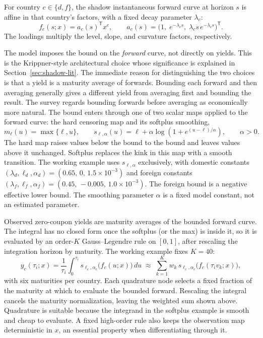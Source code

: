 \documentclass[11pt]{article}
\begin{document}
For country \(c\in\{d,f\}\), the shadow instantaneous forward curve at horizon \(s\) is affine in that country's factors, with a fixed decay parameter \(\lambda_c\):
\begin{equation}\label{eq:76}
 f_c(s;x)=a_c(s)^{\mathsf T}x^c,
 \qquad
 a_c(s)=\bigl(1,\;e^{-\lambda_c s},\;\lambda_c s\,e^{-\lambda_c s}
 \bigr)^{\mathsf T}.
\end{equation}
The loadings multiply the level, slope, and curvature factors, respectively.

The model imposes the bound on the \emph{forward} curve, not directly on yields. This is the Krippner-style architectural choice whose significance is explained in Section~\ref{sec:shadow-lit}. The immediate reason for distinguishing the two choices is that a yield is a maturity average of forwards. Bounding each forward and then averaging generally gives a different yield from averaging first and bounding the result. The survey regards bounding forwards before averaging as economically more natural. The bound enters through one of two scalar maps applied to the forward curve: the hard censoring map and its softplus smoothing,
\begin{equation}\label{eq:77}
 m_\ell(u)=\max\{\ell,u\},
 \qquad
 s_{\ell,\alpha}(u)=\ell+\alpha\log\!\left(1+e^{(u-\ell)/\alpha}\right),
 \qquad \alpha>0.
\end{equation}
The hard map raises values below the bound to the bound and leaves values above it unchanged. Softplus replaces the kink in this map with a smooth transition. The working example uses \(s_{\ell,\alpha}\) exclusively, with domestic constants
\((\lambda_d,\ell_d,\alpha_d)=(0.65,\,0,\,1.5\times10^{-3})\) and foreign constants
\((\lambda_f,\ell_f,\alpha_f)=(0.45,\,-0.005,\,1.0\times10^{-3})\). The foreign bound is a negative effective lower bound. The smoothing parameter \(\alpha\) is a fixed model constant, not an estimated parameter.

Observed zero-coupon yields are maturity averages of the bounded forward curve. The integral has no closed form once the softplus (or the max) is inside it, so it is evaluated by an order-\(K\) Gauss--Legendre rule on \([0,1]\), after rescaling the integration horizon by maturity. The working example fixes \(K=40\):
\begin{equation}\label{eq:78}
 y_c(\tau_i;x)=\frac1{\tau_i}\int_0^{\tau_i}
 s_{\ell_c,\alpha_c}\bigl(f_c(u;x)\bigr)\,du
 \;\approx\;\sum_{k=1}^{K}w_k\,
 s_{\ell_c,\alpha_c}\bigl(f_c(\tau_i v_k;x)\bigr),
\end{equation}
with six maturities per country. Each quadrature node selects a fixed fraction of the maturity at which to evaluate the bounded forward. Rescaling the integral cancels the maturity normalization, leaving the weighted sum shown above. Quadrature is suitable because the integrand in the softplus example is smooth and cheap to evaluate. A fixed high-order rule also keeps the observation map deterministic in \(x\), an essential property when differentiating through it.
\end{document}

